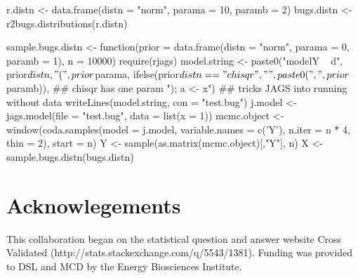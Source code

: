 \begin{example}

r.distn <- data.frame(distn = "norm", parama = 10, paramb = 2)
bugs.distn <- r2bugs.distributions(r.distn)
   
sample.bugs.distn <- function(prior = data.frame(distn = "norm", parama = 0, paramb = 1), n = 10000) {
  require(rjags)
  model.string <- paste0("model{Y ~ d", prior$distn, "(", prior$parama, 
                         ifelse(prior$distn == "chisqr", "", paste0(", ", prior$paramb)), ## chisqr has one param
                         "); a <- x}")  ## tricks JAGS into running without data  
  writeLines(model.string, con = "test.bug")
  j.model  <- jags.model(file = "test.bug", data = list(x = 1))
  mcmc.object <- window(coda.samples(model = j.model, variable.names = c('Y'), n.iter = n * 4, thin = 2),
                        start = n)
  Y <- sample(as.matrix(mcmc.object)[,"Y"], n)
}
X <- sample.bugs.distn(bugs.distn)
\end{example}

\section{Acknowlegements}

This collaboration began on the statistical question and answer website Cross Validated (http://stats.stackexchange.com/q/5543/1381). Funding was provided to DSL and MCD by the Energy Biosciences Institute.




\address{David S.\ LeBauer\\
Energy Biosciences Institute\\
University of Illinois
USA}\\

\address{Michael C.\ Dietze\\
Department of Earth And Environment\\
Boston University\\
USA}

\address{Ben M.\ Bolker\\
Department of Mathematics and Statistics\\
McMaster University\\
Canada}
